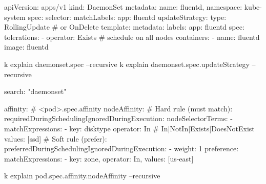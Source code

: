 \begin{tcbitemize}[
  raster columns=4, raster equal height=rows,
  blanker, cheat subtitle
]
\begin{tcbitemize}[
      raster columns=1, raster equal height=rows,
      blanker, cheat subtitle
    ]
        \begin{cheatcodebash}
        apiVersion: apps/v1
        kind: DaemonSet
        metadata: {name: fluentd, namespace: kube-system}
        spec:
          selector: {matchLabels: {app: fluentd}}
          updateStrategy:
            type: RollingUpdate    # or OnDelete
          template:
            metadata: {labels: {app: fluentd}}
            spec:
              tolerations:
              - operator: Exists   # schedule on all nodes
              containers:
              - name: fluentd
                image: fluentd
        \end{cheatcodebash}

        \begin{cheatcodebash}
        k explain daemonset.spec --recursive
        k explain daemonset.spec.updateStrategy --recursive
        \end{cheatcodebash}

        \begin{cheatcodebash}
        search: "daemonset"
        \end{cheatcodebash}

    \end{tcbitemize}

  \tcbitem
    \begin{tcbitemize}[
      raster columns=1, raster equal height=rows,
      blanker, cheat subtitle
    ]

      \tcbitem
        \begin{cheatcodebash}
        affinity:              # <pod>.spec.affinity
          nodeAffinity:
            # Hard rule (must match):
            requiredDuringSchedulingIgnoredDuringExecution:
              nodeSelectorTerms:
              - matchExpressions:
                - key: disktype
                  operator: In     # In|NotIn|Exists|DoesNotExist
                  values: [ssd]
            # Soft rule (prefer):
            preferredDuringSchedulingIgnoredDuringExecution:
            - weight: 1
              preference:
                matchExpressions:
                - {key: zone, operator: In, values: [us-east]}
        \end{cheatcodebash}

        \begin{cheatcodebash}
        k explain pod.spec.affinity.nodeAffinity --recursive
        \end{cheatcodebash}


\end{tcbitemize}
\end{tcbitemize}
